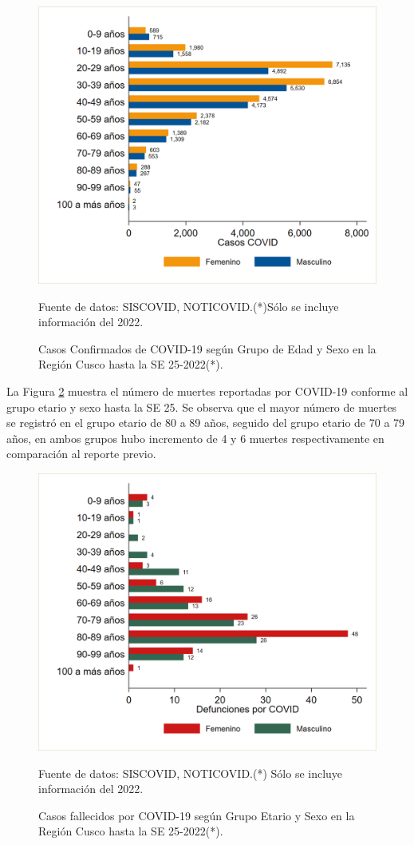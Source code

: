 \documentclass[12pt,a4paper,openany]{book}
\begin{document}
	
	\begin{figure}[h]
		\caption{Casos Confirmados de COVID-19 según Grupo de Edad y Sexo en la Región Cusco hasta la SE 25-2022(*).}\label{fig:casos_edad_sexo}
		\begin{center}
			\includegraphics[width=0.75\linewidth]{../figuras/casos_etapavida_2022}
		\end{center}
		{\footnotesize {Fuente de datos: SISCOVID, NOTICOVID.(*)Sólo se incluye información del 2022.}}
	\end{figure}
	\pagebreak
	
	
	La Figura \ref{fig:fallecidos_edad_sexo}  muestra el número de muertes reportadas por COVID-19 conforme al grupo etario y sexo hasta la SE 25. Se observa que el mayor número de muertes se registró en el grupo etario de 80 a 89 años, seguido del grupo etario de 70 a 79 años, en ambos grupos hubo incremento de 4 y 6 muertes respectivamente en comparación al reporte previo. 
	
	\begin{figure}[h]
		\caption{Casos fallecidos por COVID-19 según Grupo Etario y Sexo en la Región Cusco hasta la SE 25-2022(*).}\label{fig:fallecidos_edad_sexo}
		\begin{center}
			\includegraphics[width=0.75\linewidth]{../figuras/defunciones_etapavida_2022}
		\end{center}
		{\footnotesize {Fuente de datos: SISCOVID, NOTICOVID.(*) Sólo se incluye información del 2022.}}
	\end{figure}
	
\end{document}
